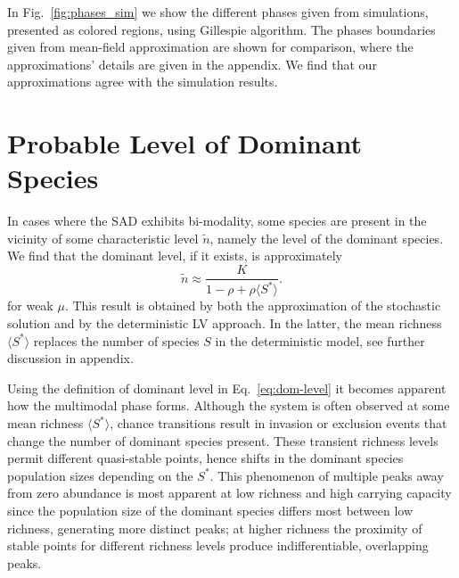 \documentclass[%
 amsmath,amssymb,
reprint,%
linenumbers]{revtex4-2}
\begin{document}
In Fig.~\ref{fig:phases_sim} we show the different phases given from simulations, presented as colored regions, using Gillespie algorithm. 
The phases boundaries given from mean-field approximation are shown for comparison, where the approximations' details are given in the appendix. 
We find that our approximations agree with the simulation results.


\section{Probable Level of Dominant Species}

\label{sec:Dom_species}

In cases where the SAD exhibits bi-modality, some species are present in the vicinity of some characteristic level $\tilde{n}$, namely the level of the dominant species. We find that the dominant level, if it exists, is approximately
\begin{equation}
    \tilde{n}\approx \frac{K}{1-\rho+\rho \langle S^*\rangle }.
    \label{eq:dom-level}
\end{equation}
for weak $\mu$. 
This result is obtained  by both the approximation of the stochastic solution and by the deterministic LV approach. 
In the latter, the mean richness $\langle S^*\rangle $ replaces the number of species $S$ in the deterministic model, see further discussion in appendix.

Using the definition of dominant level in Eq.~\eqref{eq:dom-level} it becomes apparent how the multimodal phase forms. Although the system is often observed at some mean richness $\langle S^* \rangle$, chance transitions result in invasion or exclusion events that change the number of dominant species present.
These transient richness levels permit different quasi-stable points, hence shifts in the dominant species population sizes depending on the $S^*$.
This phenomenon of multiple peaks away from zero abundance is most apparent at low richness and high carrying capacity since the population size of the dominant species differs most between low richness, generating more distinct peaks; at higher richness the proximity of stable points for different richness levels produce indifferentiable, overlapping peaks.

\end{document}
